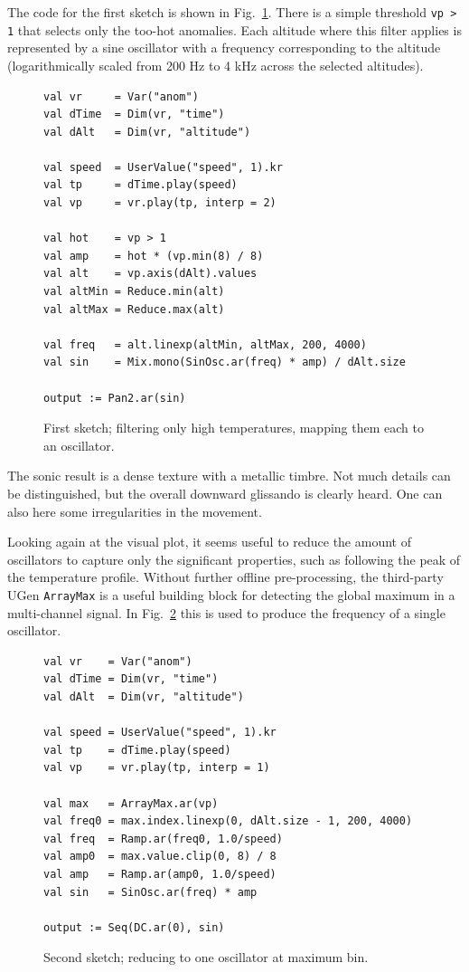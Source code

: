 \documentclass[11pt,a4paper]{article}
\newcommand{\figref}[1]{Fig.~\ref{#1}}
\begin{document}
The code for the first sketch is shown in \figref{fig:sketch-1}. There is a simple threshold \Verb!vp > 1! that selects only the too-hot anomalies. Each altitude where this filter applies is represented by a sine oscillator with a frequency corresponding to the altitude (logarithmically scaled from 200 Hz to 4 kHz across the selected altitudes).

\begin{figure}
\begin{lstlisting}[style=scala]
val vr     = Var("anom")
val dTime  = Dim(vr, "time")
val dAlt   = Dim(vr, "altitude")

val speed  = UserValue("speed", 1).kr
val tp     = dTime.play(speed)
val vp     = vr.play(tp, interp = 2)

val hot    = vp > 1
val amp    = hot * (vp.min(8) / 8)
val alt    = vp.axis(dAlt).values
val altMin = Reduce.min(alt)
val altMax = Reduce.max(alt)

val freq   = alt.linexp(altMin, altMax, 200, 4000)
val sin    = Mix.mono(SinOsc.ar(freq) * amp) / dAlt.size

output := Pan2.ar(sin)
\end{lstlisting}
\caption{First sketch; filtering only high temperatures,
mapping them each to an oscillator.}
\label{fig:sketch-1}
\end{figure}

The sonic result is a dense texture with a metallic timbre. Not much details can be distinguished, but the overall downward glissando is clearly heard. One can also here some irregularities in the movement.

Looking again at the visual plot, it seems useful to reduce the amount of oscillators to capture only the significant properties, such as following the peak of the temperature profile. Without further offline pre-processing, the third-party UGen \Verb!ArrayMax! is a useful building block for detecting the global maximum in a multi-channel signal. In \figref{fig:sketch-2} this is used to produce the frequency of a single oscillator.

\begin{figure}
\begin{lstlisting}[style=scala]
val vr    = Var("anom")
val dTime = Dim(vr, "time")
val dAlt  = Dim(vr, "altitude")

val speed = UserValue("speed", 1).kr
val tp    = dTime.play(speed)
val vp    = vr.play(tp, interp = 1)

val max   = ArrayMax.ar(vp)
val freq0 = max.index.linexp(0, dAlt.size - 1, 200, 4000)
val freq  = Ramp.ar(freq0, 1.0/speed)
val amp0  = max.value.clip(0, 8) / 8
val amp   = Ramp.ar(amp0, 1.0/speed)
val sin   = SinOsc.ar(freq) * amp

output := Seq(DC.ar(0), sin)
\end{lstlisting}
\caption{Second sketch; reducing to one oscillator at maximum bin.}
\label{fig:sketch-2}
\end{figure}
\end{document}
